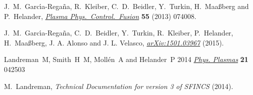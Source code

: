 \documentclass[12pt]{article}
\begin{document}
\begin{thebibliography}{99}

 J.~M.~Garc\'{\i}a-Rega\~{n}a, R.~Kleiber, C.~D.~Beidler, Y.~Turkin, H.~Maa{\ss}berg  
and P.~Helander, 
\href{http://dx.doi.org/10.1088/0741-3335/55/7/074008}{\em Plasma Phys.~Control.~Fusion} {\bf 55} (2013) 074008.

 J.~M.~Garc\'{\i}a-Rega\~{n}a, C.~D.~Beidler, Y.~Turkin, R.~Kleiber, P.~Helander, H.~Maa{\ss}berg, J. A. Alonso and J. L. Velasco,  
\href{http://arxiv.org/abs/1501.03967}{\em arXiv:1501.03967} (2015).

 Landreman~M, Smith~H~M, Moll\'en~A and Helander~P 2014
 \href{http://dx.doi.org/10.1063/1.4870077}{\em Phys. Plasmas} {\bf 21} 042503
 
 M.~Landreman, {\em Technical Documentation for version 3 of SFINCS} (2014).

  



\end{thebibliography}
\end{document}
